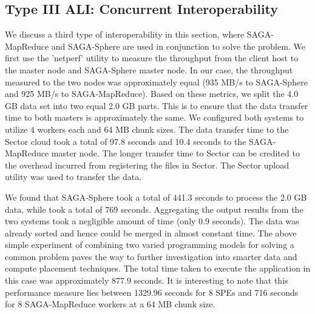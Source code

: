 \documentclass[3p,twocolumn]{elsarticle}
\begin{document}




\subsection{Type III ALI: Concurrent Interoperability}

We discuss a third type of interoperability in this section, where
SAGA-MapReduce and SAGA-Sphere are used in conjunction to solve the
\wc problem. We first use the 'netperf' utility to measure the
throughput from the client host to the \sagamapreduce master node and
SAGA-Sphere master node.  In our case, the throughput measured to the
two nodes was approximately equal (935 MB/s to SAGA-Sphere and 925
MB/s to SAGA-MapReduce).  Based on these metrics, we split the 4.0 GB
data set into two equal 2.0 GB parts. This is to ensure that the data
transfer time to both masters is approximately the same. We configured
both systems to utilize 4 workers each and 64 MB chunk sizes. The data
transfer time to the Sector cloud took a total of 97.8 seconds and
10.4 seconds to the SAGA-MapReduce master node. The longer transfer
time to Sector can be credited to the overhead incurred from
registering the files in Sector. The Sector upload utility was used 
to transfer the data. 

We found that SAGA-Sphere took a total of 441.3 seconds to process the
2.0 GB data, while \sagamapreduce took a total of 769
seconds. Aggregating the output results from the two systems took a
negligible amount of time (only 0.9 seconds). The data was already
sorted and hence could be merged in almost constant
time. %
The above simple experiment of combining two varied programming models
for solving a common problem paves the way to further investigation
into smarter data and compute placement techniques.  The total time
taken to execute the \wc application in this case was approximately
877.9 seconds. It is interesting to note that this performance measure
lies between 1329.96 seconds for 8 SPEs and 716 seconds for 8
SAGA-MapReduce workers at a 64 MB chunk size.
\end{document}
